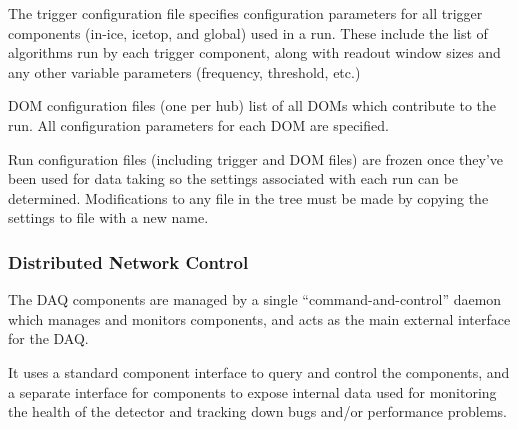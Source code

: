 The trigger configuration file specifies configuration parameters for all
trigger components (in-ice, icetop, and global) used in a run.  These include
the list of algorithms run by each trigger component, along with readout window
sizes and any other variable parameters (frequency, threshold, etc.)

DOM configuration files (one per hub) list of all DOMs which contribute to the
run.  All configuration parameters for each DOM are specified.

Run configuration files (including trigger and DOM files) are frozen once
they've been used for data taking so the settings associated with each run can
be determined.  Modifications to any file in the tree must be made by copying
the settings to file with a new name.

\subsubsection{Distributed Network Control}


The DAQ components are managed by a single ``command-and-control'' daemon
which manages and monitors components, and acts as the main
external interface for the DAQ.

It uses a standard component interface to query and
control the components, and a separate interface for components to expose
internal data used for monitoring the health of the detector and tracking
down bugs and/or performance problems.


